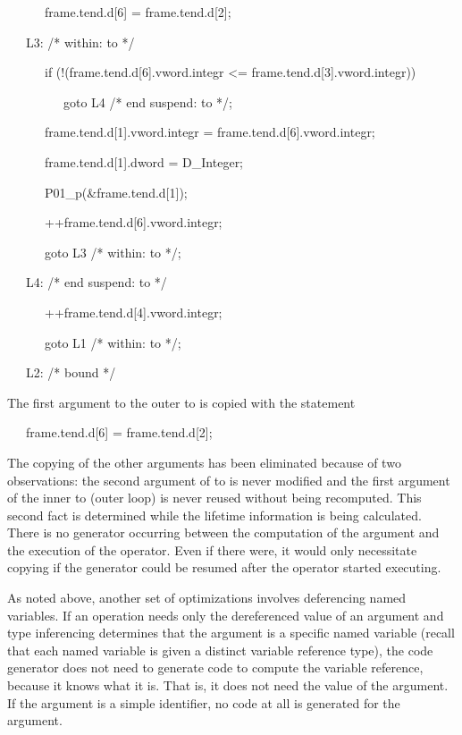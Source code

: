 {\ttfamily\mdseries
\ \ \ \ \ \ frame.tend.d[6] = frame.tend.d[2];}

{\ttfamily\mdseries
\ \ \ L3: /* within: to */}

{\ttfamily\mdseries
\ \ \ \ \ \ if (!(frame.tend.d[6].vword.integr {\textless}= frame.tend.d[3].vword.integr))}

{\ttfamily\mdseries
\ \ \ \ \ \ \ \ \ goto L4 /* end suspend: to */;}

{\ttfamily\mdseries
\ \ \ \ \ \ frame.tend.d[1].vword.integr = frame.tend.d[6].vword.integr;}

{\ttfamily\mdseries
\ \ \ \ \ \ frame.tend.d[1].dword = D\_Integer;}

{\ttfamily\mdseries
\ \ \ \ \ \ P01\_p(\&frame.tend.d[1]);}

{\ttfamily\mdseries
\ \ \ \ \ \ ++frame.tend.d[6].vword.integr;}

{\ttfamily\mdseries
\ \ \ \ \ \ goto L3 /* within: to */;}

{\ttfamily\mdseries
\ \ \ L4: /* end suspend: to */}

{\ttfamily\mdseries
\ \ \ \ \ \ ++frame.tend.d[4].vword.integr;}

{\ttfamily\mdseries
\ \ \ \ \ \ goto L1 /* within: to */;}

{\ttfamily\mdseries
\ \ \ L2: /* bound */}


The first argument to the outer to is copied with the statement 

{\ttfamily\mdseries
\ \ \ frame.tend.d[6] = frame.tend.d[2];}


The copying of the other arguments has been eliminated because of two
observations: the second argument of to is never modified and the
first argument of the inner to (outer loop) is never reused without
being recomputed. This second fact is determined while the lifetime
information is being calculated. There is no generator occurring
between the computation of the argument and the execution of the
operator. Even if there were, it would only necessitate copying if the
generator could be resumed after the operator started executing.

As noted above, another set of optimizations involves deferencing
named variables. If an operation needs only the dereferenced value of
an argument and type inferencing determines that the argument is a
specific named variable (recall that each named variable is given a
distinct variable reference type), the code generator does not need to
generate code to compute the variable reference, because it knows what
it is. That is, it does not need the value of the argument. If the
argument is a simple identifier, no code at all is generated for the
argument.

